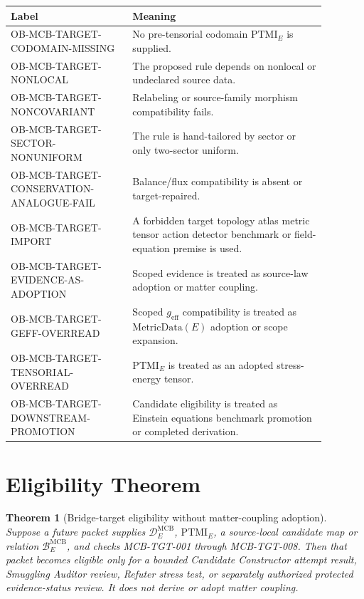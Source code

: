 \documentclass[11pt]{article}
\newcommand{\MetricData}{\mathrm{MetricData}}
\newcommand{\geff}{g_{\mathrm{eff}}}
\newcommand{\PTMI}{\mathrm{PTMI}}
\newtheorem{theorem}{Theorem}
\begin{document}
\begin{longtable}{p{0.34\linewidth}p{0.54\linewidth}}
\toprule
Label & Meaning \\
\midrule
OB-MCB-TARGET-CODOMAIN-MISSING & No pre-tensorial codomain \(\PTMI_E\) is supplied. \\
OB-MCB-TARGET-NONLOCAL & The proposed rule depends on nonlocal or undeclared source data. \\
OB-MCB-TARGET-NONCOVARIANT & Relabeling or source-family morphism compatibility fails. \\
OB-MCB-TARGET-SECTOR-NONUNIFORM & The rule is hand-tailored by sector or only two-sector uniform. \\
OB-MCB-TARGET-CONSERVATION-ANALOGUE-FAIL & Balance/flux compatibility is absent or target-repaired. \\
OB-MCB-TARGET-IMPORT & A forbidden target topology atlas metric tensor action detector benchmark or field-equation premise is used. \\
OB-MCB-TARGET-EVIDENCE-AS-ADOPTION & Scoped evidence is treated as source-law adoption or matter coupling. \\
OB-MCB-TARGET-GEFF-OVERREAD & Scoped \(\geff\) compatibility is treated as \(\MetricData(E)\) adoption or scope expansion. \\
OB-MCB-TARGET-TENSORIAL-OVERREAD & \(\PTMI_E\) is treated as an adopted stress-energy tensor. \\
OB-MCB-TARGET-DOWNSTREAM-PROMOTION & Candidate eligibility is treated as Einstein equations benchmark promotion or completed derivation. \\
\bottomrule
\end{longtable}

\section{Eligibility Theorem}

\begin{theorem}[Bridge-target eligibility without matter-coupling adoption]
Suppose a future packet supplies \(\mathcal{D}^{\mathrm{MCB}}_E\),
\(\PTMI_E\), a source-local candidate map or relation
\(\mathcal{B}^{\mathrm{MCB}}_E\), and checks MCB-TGT-001 through
MCB-TGT-008. Then that packet becomes eligible only for a bounded Candidate
Constructor attempt result, Smuggling Auditor review, Refuter stress test, or
separately authorized protected evidence-status review. It does not derive or
adopt matter coupling.
\end{theorem}
\end{document}
